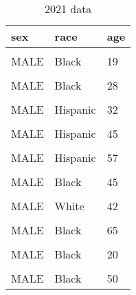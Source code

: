 \documentclass[
  letterpaper,
  DIV=11,
  numbers=noendperiod]{scrartcl}
\begin{document}
\begin{table}

\caption{2021 data}
\centering
\begin{tabular}[t]{lll}
\toprule
sex & race & age\\
\midrule
\cellcolor{gray!6}{MALE} & \cellcolor{gray!6}{Black} & \cellcolor{gray!6}{40}\\
MALE & Black & \vphantom{1} 19\\
\cellcolor{gray!6}{MALE} & \cellcolor{gray!6}{Asain Pacific Islander} & \cellcolor{gray!6}{(null)}\\
MALE & Black & 28\\
\cellcolor{gray!6}{MALE} & \cellcolor{gray!6}{Black} & \cellcolor{gray!6}{19}\\
\addlinespace
MALE & Hispanic & 32\\
\cellcolor{gray!6}{MALE} & \cellcolor{gray!6}{Black} & \cellcolor{gray!6}{32}\\
MALE & Hispanic & 45\\
\cellcolor{gray!6}{MALE} & \cellcolor{gray!6}{Black} & \cellcolor{gray!6}{27}\\
MALE & Hispanic & 57\\
\addlinespace
\cellcolor{gray!6}{MALE} & \cellcolor{gray!6}{Black} & \cellcolor{gray!6}{(null)}\\
MALE & Black & 45\\
\cellcolor{gray!6}{MALE} & \cellcolor{gray!6}{Hispanic} & \cellcolor{gray!6}{17}\\
MALE & White & 42\\
\cellcolor{gray!6}{MALE} & \cellcolor{gray!6}{Hispanic} & \cellcolor{gray!6}{43}\\
\addlinespace
MALE & Black & 65\\
\cellcolor{gray!6}{MALE} & \cellcolor{gray!6}{Hispanic} & \cellcolor{gray!6}{30}\\
MALE & Black & \vphantom{1} 20\\
\cellcolor{gray!6}{MALE} & \cellcolor{gray!6}{Black} & \cellcolor{gray!6}{20}\\
MALE & Black & 50\\
\bottomrule
\end{tabular}
\end{table}

\newpage
\end{document}
